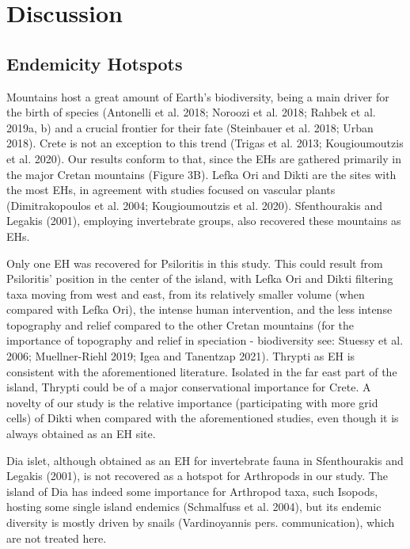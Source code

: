 \section{Discussion}
\label{sec:arthropods-discussion}

    \subsection{Endemicity Hotspots}
    \label{subsec:arthropods-Endemicity-Hotspots}

Mountains host a great amount of Earth’s biodiversity, being a main driver for
the birth of species (Antonelli et al. 2018; Noroozi et al. 2018; Rahbek et al. 2019a, b)
and a crucial frontier for their fate (Steinbauer et al. 2018; Urban 2018).
Crete is not an exception to this trend (Trigas et al. 2013; Kougioumoutzis et al. 2020).
Our results conform to that, since the EHs are gathered primarily in the major
Cretan mountains (Figure 3B). Lefka Ori and Dikti are the sites with the most
EHs, in agreement with studies focused on vascular plants (Dimitrakopoulos et al. 2004; Kougioumoutzis et al. 2020).
Sfenthourakis and Legakis (2001), employing invertebrate groups, also recovered these mountains as EHs.

Only one EH was recovered for Psiloritis in this study. This could result from
Psiloritis’ position in the center of the island, with Lefka Ori and Dikti
filtering taxa moving from west and east, from its relatively smaller volume
(when compared with Lefka Ori), the intense human intervention, and the less
intense topography and relief compared to the other Cretan mountains (for the
importance of topography and relief in speciation - biodiversity see: Stuessy et al. 2006; Muellner-Riehl 2019; Igea and Tanentzap 2021).
Thrypti as EH is consistent with the aforementioned literature. Isolated in the
far east part of the island, Thrypti could be of a major conservational importance for Crete.
A novelty of our study is the relative importance (participating with more grid cells)
of Dikti when compared with the aforementioned studies, even though it is always obtained as an EH site. 

Dia islet, although obtained as an EH for invertebrate fauna in Sfenthourakis
and Legakis (2001), is not recovered as a hotspot for Arthropods in our study.
The island of Dia has indeed some importance for Arthropod taxa, such Isopods,
hosting some single island endemics (Schmalfuss et al. 2004), but its endemic
diversity is mostly driven by snails (Vardinoyannis pers. communication), which
are not treated here.

